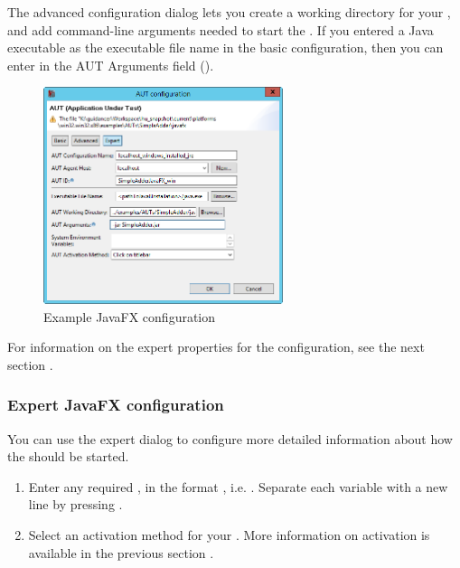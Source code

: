 The advanced configuration dialog lets you create a working directory for your \gdaut{}, and add command-line arguments needed to start the \gdaut{}. If you entered a Java executable as the executable file name in the basic configuration, then you can enter  in the AUT Arguments field ().

\begin{figure}[h]
\begin{center}
\includegraphics[width=7cm]{Tasks/AUTs/PS/javafxconfigwithjar}
\caption{Example JavaFX \gdaut{} configuration}
\label{autconfigjavafxwithjar}
\end{center}
\end{figure}

For information on the expert properties for the \gdaut{} configuration, see the next section . 

\subsubsection{Expert JavaFX \gdaut{} configuration}
\label{ExpertAUTConfig}
You can use the expert dialog to configure more detailed information about how the \gdaut{} should be started. 


\begin{enumerate}
\item Enter any required , in the
format , i.e. . 
Separate each variable with a new line by pressing .



\item Select an activation method for your \gdaut{}. More information on \gdaut{} activation is available in the previous section .


\end{enumerate}
